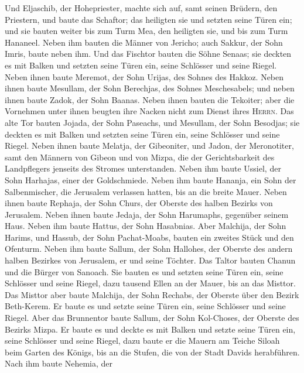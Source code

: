  Und Eljaschib, der Hohepriester, machte sich auf, samt
seinen Brüdern, den Priestern, und baute das Schaftor; das heiligten sie
und setzten seine Türen ein; und sie bauten weiter bis zum Turm Mea, den
heiligten sie, und bis zum Turm Hananeel.  Neben ihm
bauten die Männer von Jericho; auch Sakkur, der Sohn Imris, baute neben
ihm.  Und das Fischtor bauten die Söhne Senaas; sie
deckten es mit Balken und setzten seine Türen ein, seine Schlösser und
seine Riegel.  Neben ihnen baute Meremot, der Sohn Urijas,
des Sohnes des Hakkoz. Neben ihnen baute Mesullam, der Sohn Berechjas,
des Sohnes Meschesabels; und neben ihnen baute Zadok, der Sohn Baanas.
 Neben ihnen bauten die Tekoiter; aber die Vornehmen unter
ihnen beugten ihre Nacken nicht zum Dienst ihres \textsc{Herrn}.
 Das alte Tor bauten Jojada, der Sohn Paseachs, und
Mesullam, der Sohn Besodjas; sie deckten es mit Balken und setzten seine
Türen ein, seine Schlösser und seine Riegel.  Neben ihnen
baute Melatja, der Gibeoniter, und Jadon, der Meronotiter, samt den
Männern von Gibeon und von Mizpa, die der Gerichtsbarkeit des
Landpflegers jenseits des Stromes unterstanden.  Neben ihm
baute Ussiel, der Sohn Harhajas, einer der Goldschmiede. Neben ihm baute
Hananja, ein Sohn der Salbenmischer, die Jerusalem verlassen hatten, bis
an die breite Mauer.  Neben ihnen baute Rephaja, der Sohn
Churs, der Oberste des halben Bezirks von Jerusalem. 
Neben ihnen baute Jedaja, der Sohn Harumaphs, gegenüber seinem Haus.
Neben ihm baute Hattus, der Sohn Hasabnias.  Aber
Malchija, der Sohn Harims, und Hassub, der Sohn Pachat-Moabs, bauten ein
zweites Stück und den Ofenturm.  Neben ihm baute Sallum,
der Sohn Hallohes, der Oberste des andern halben Bezirkes von Jerusalem,
er und seine Töchter.  Das Taltor bauten Chanun und die
Bürger von Sanoach. Sie bauten es und setzten seine Türen ein, seine
Schlösser und seine Riegel, dazu tausend Ellen an der Mauer, bis an das
Misttor.  Das Misttor aber baute Malchija, der Sohn
Rechabs, der Oberste über den Bezirk Beth-Kerem. Er baute es und setzte
seine Türen ein, seine Schlösser und seine Riegel.  Aber
das Brunnentor baute Sallum, der Sohn Kol-Choses, der Oberste des
Bezirks Mizpa. Er baute es und deckte es mit Balken und setzte seine
Türen ein, seine Schlösser und seine Riegel, dazu baute er die Mauern am
Teiche Siloah beim Garten des Königs, bis an die Stufen, die von der
Stadt Davids herabführen.  Nach ihm baute Nehemia, der
